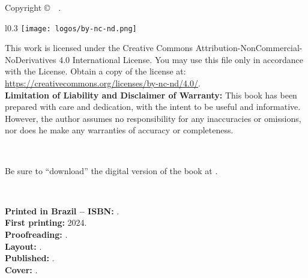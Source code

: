 
\newpage
\thispagestyle{empty}

\noindent Copyright \copyright\ \BookEditionYear\ \BookAuthor.\ %

\begin{wrapfigure}{l}{0.3\textwidth}
\vspace{-10pt}
\texttt{[image: logos/by-nc-nd.png]}
\vspace{-10pt}
\end{wrapfigure}
\noindent This work is licensed under the Creative Commons Attribution-NonCommercial-NoDerivatives 4.0 International License.
You may use this file only in accordance with the License. Obtain a copy of the license at:
\url{https://creativecommons.org/licenses/by-nc-nd/4.0/}.\\ %

\noindent \textbf{Limitation of Liability and Disclaimer of Warranty:}
This book has been prepared with care and dedication,
with the intent to be useful and informative.
However, the author assumes no responsibility for any inaccuracies or omissions,
nor does he make any warranties of accuracy or completeness.

~

\noindent Be sure to ``download'' the digital version of the book at \BookLinkHomePage.

~

\noindent \textbf{Printed in Brazil -- ISBN:} \BookISBN.\\ %
\noindent \textbf{First printing:} 2024.\\ %
\noindent \textbf{Proofreading:} \BookAuthor.\\ %
\noindent \textbf{Layout:} \BookAuthor.\\ %
\noindent \textbf{Published:} \BookPublisher.\\ %
\noindent \textbf{Cover:} \BookAuthor. %

~


\SetBookAuthorLastName{\BookAuthorLastName}
\SetBookAuthorName{\BookAuthorName}
\SetBookAuthorYearBorn{\BookAuthorBorn}
\SetBookTitle{\BookTitle}
\SetBookSubTitle{\BookSubTitle}
\SetBookPublishingPlace{\BookEditionLocal}
\SetBookPublishingEditor{\BookPublisher}
\SetBookPublishingYear{\BookEditionYear}
\SetBookPaperSize{\BookPaperSizeString}
\SetBookHasBibliography{\BookHasBibliography}
\SetBookISBN{\BookISBN}
\SetBookKeyWordA{\BookKeyWordA}
\SetBookKeyWordB{\BookKeyWordB}
\SetBookKeyWordC{\BookKeyWordC}
\SetBookCDD{\BookCDD}
\SetBookCDU{\BookCDU}

~

\begin{center}
\CatalographicCard{12.5cm}
\end{center}


